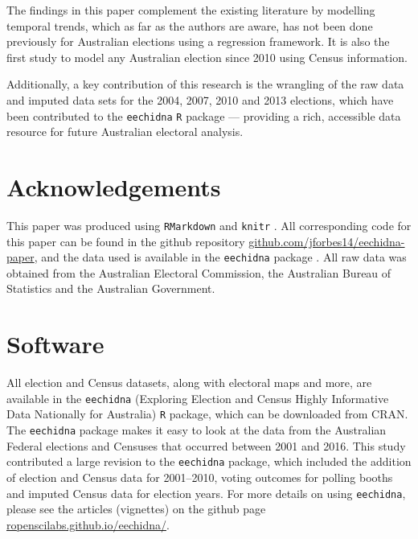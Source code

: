 \documentclass[11pt,a4paper,]{article}
\begin{document}
The findings in this paper complement the existing literature by modelling temporal trends, which as far as the authors are aware, has not been done previously for Australian elections using a regression framework. It is also the first study to model any Australian election since 2010 using Census information.

Additionally, a key contribution of this research is the wrangling of the raw data and imputed data sets for the 2004, 2007, 2010 and 2013 elections, which have been contributed to the \texttt{eechidna} \texttt{R} package --- providing a rich, accessible data resource for future Australian electoral analysis.

\hypertarget{acknowledgements}{%
\section{Acknowledgements}\label{acknowledgements}}

This paper was produced using \texttt{RMarkdown} \autocite{rmarkdown} and \texttt{knitr} \autocite{knitr}. All corresponding code for this paper can be found in the github repository \href{https://github.com/jforbes14/eechidna-paper}{github.com/jforbes14/eechidna-paper}, and the data used is available in the \texttt{eechidna} package \autocite{eechidna}. All raw data was obtained from the Australian Electoral Commission, the Australian Bureau of Statistics and the Australian Government.

\hypertarget{software}{%
\section{Software}\label{software}}

All election and Census datasets, along with electoral maps and more, are available in the \texttt{eechidna} (Exploring Election and Census Highly Informative Data Nationally for Australia) \texttt{R} package, which can be downloaded from CRAN. The \texttt{eechidna} package makes it easy to look at the data from the Australian Federal elections and Censuses that occurred between 2001 and 2016. This study contributed a large revision to the \texttt{eechidna} package, which included the addition of election and Census data for 2001--2010, voting outcomes for polling booths and imputed Census data for election years. For more details on using \texttt{eechidna}, please see the articles (vignettes) on the github page \href{https://ropenscilabs.github.io/eechidna/}{ropenscilabs.github.io/eechidna/}.
\end{document}
